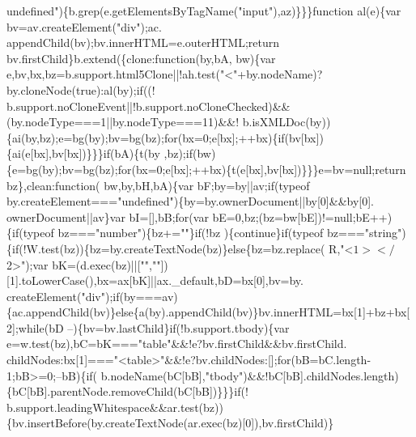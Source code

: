 \begin{DoxyCode}
{      undefined"})\{b.grep(e.getElementsByTagName(\textcolor{stringliteral}{"input"}),az)\}\}\}\textcolor{keyword}{function} al(e)\{var bv=av.createElement(\textcolor{stringliteral}{"div"});ac.
      appendChild(bv);bv.innerHTML=e.outerHTML;\textcolor{keywordflow}{return} bv.firstChild\}b.extend(\{clone:\textcolor{keyword}{function}(by,bA,
      bw)\{var e,bv,bx,bz=b.support.html5Clone||!ah.test(\textcolor{stringliteral}{"<"}+by.nodeName)?by.cloneNode(\textcolor{keyword}{true}):al(by);\textcolor{keywordflow}{if}((!
      b.support.noCloneEvent||!b.support.noCloneChecked)&&(by.nodeType===1||by.nodeType===11)&&!
      b.isXMLDoc(by))\{ai(by,bz);e=bg(by);bv=bg(bz);\textcolor{keywordflow}{for}(bx=0;e[bx];++bx)\{\textcolor{keywordflow}{if}(bv[bx])\{ai(e[bx],bv[bx])\}\}\}\textcolor{keywordflow}{if}(bA)\{t(by
      ,bz);\textcolor{keywordflow}{if}(bw)\{e=bg(by);bv=bg(bz);\textcolor{keywordflow}{for}(bx=0;e[bx];++bx)\{t(e[bx],bv[bx])\}\}\}e=bv=null;\textcolor{keywordflow}{return} bz\},clean:\textcolor{keyword}{function}(
      bw,by,bH,bA)\{var bF;by=by||av;\textcolor{keywordflow}{if}(typeof by.createElement===\textcolor{stringliteral}{"undefined"})\{by=by.ownerDocument||by[0]&&by[0].
      ownerDocument||av\}var bI=[],bB;\textcolor{keywordflow}{for}(var bE=0,bz;(bz=bw[bE])!=null;bE++)\{\textcolor{keywordflow}{if}(typeof bz===\textcolor{stringliteral}{"number"})\{bz+=\textcolor{stringliteral}{""}\}\textcolor{keywordflow}{if}(!bz
      )\{\textcolor{keywordflow}{continue}\}\textcolor{keywordflow}{if}(typeof bz===\textcolor{stringliteral}{"string"})\{\textcolor{keywordflow}{if}(!W.test(bz))\{bz=by.createTextNode(bz)\}\textcolor{keywordflow}{else}\{bz=bz.replace(
      R,\textcolor{stringliteral}{"<$1></$2>"});var bK=(d.exec(bz)||[\textcolor{stringliteral}{""},\textcolor{stringliteral}{""}])[1].toLowerCase(),bx=ax[bK]||ax.\_default,bD=bx[0],bv=by.
      createElement(\textcolor{stringliteral}{"div"});\textcolor{keywordflow}{if}(by===av)\{ac.appendChild(bv)\}\textcolor{keywordflow}{else}\{a(by).appendChild(bv)\}bv.innerHTML=bx[1]+bz+bx[2];\textcolor{keywordflow}{while}(bD
      --)\{bv=bv.lastChild\}\textcolor{keywordflow}{if}(!b.support.tbody)\{var e=w.test(bz),bC=bK===\textcolor{stringliteral}{"table"}&&!e?bv.firstChild&&bv.firstChild.
      childNodes:bx[1]===\textcolor{stringliteral}{"<table>"}&&!e?bv.childNodes:[];\textcolor{keywordflow}{for}(bB=bC.length-1;bB>=0;--bB)\{\textcolor{keywordflow}{if}(
      b.nodeName(bC[bB],\textcolor{stringliteral}{"tbody"})&&!bC[bB].childNodes.length)\{bC[bB].parentNode.removeChild(bC[bB])\}\}\}\textcolor{keywordflow}{if}(!
      b.support.leadingWhitespace&&ar.test(bz))\{bv.insertBefore(by.createTextNode(ar.exec(bz)[0]),bv.firstChild)\}

\end{DoxyCode}
